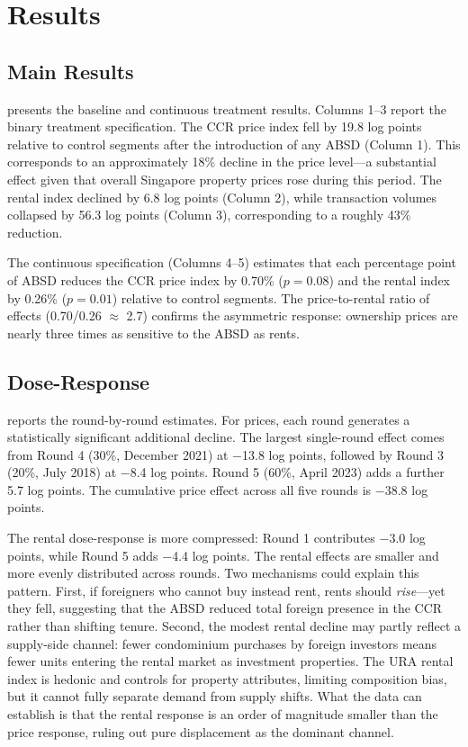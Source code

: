 \documentclass[12pt]{article}
\begin{document}
\section{Results}\label{sec:results}

\subsection{Main Results}

 presents the baseline and continuous treatment results. Columns 1--3 report the binary treatment specification. The CCR price index fell by 19.8 log points relative to control segments after the introduction of any ABSD (Column 1). This corresponds to an approximately 18\% decline in the price level---a substantial effect given that overall Singapore property prices rose during this period. The rental index declined by 6.8 log points (Column 2), while transaction volumes collapsed by 56.3 log points (Column 3), corresponding to a roughly 43\% reduction.

The continuous specification (Columns 4--5) estimates that each percentage point of ABSD reduces the CCR price index by 0.70\% ($p = 0.08$) and the rental index by 0.26\% ($p = 0.01$) relative to control segments. The price-to-rental ratio of effects (0.70/0.26 $\approx$ 2.7) confirms the asymmetric response: ownership prices are nearly three times as sensitive to the ABSD as rents.



\subsection{Dose-Response}

 reports the round-by-round estimates. For prices, each round generates a statistically significant additional decline. The largest single-round effect comes from Round 4 (30\%, December 2021) at $-$13.8 log points, followed by Round 3 (20\%, July 2018) at $-$8.4 log points. Round 5 (60\%, April 2023) adds a further 5.7 log points. The cumulative price effect across all five rounds is $-$38.8 log points.

The rental dose-response is more compressed: Round 1 contributes $-$3.0 log points, while Round 5 adds $-$4.4 log points. The rental effects are smaller and more evenly distributed across rounds. Two mechanisms could explain this pattern. First, if foreigners who cannot buy instead rent, rents should \emph{rise}---yet they fell, suggesting that the ABSD reduced total foreign presence in the CCR rather than shifting tenure. Second, the modest rental decline may partly reflect a supply-side channel: fewer condominium purchases by foreign investors means fewer units entering the rental market as investment properties. The URA rental index is hedonic and controls for property attributes, limiting composition bias, but it cannot fully separate demand from supply shifts. What the data can establish is that the rental response is an order of magnitude smaller than the price response, ruling out pure displacement as the dominant channel.
\end{document}
